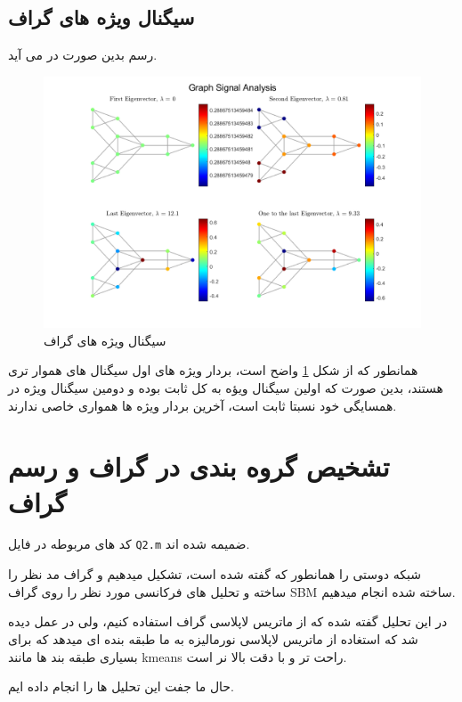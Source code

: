 \subsection{سیگنال ویژه های گراف}

رسم بدین صورت در می آید.

\begin{figure}[h]
	\centering
	\includegraphics*[width=\linewidth]{../results/Q1/eigenvalues.png}
	\caption{سیگنال ویژه های گراف}
	\label{fig:eigvec}
\end{figure}

همانطور که از شکل \ref{fig:eigvec} واضح است، بردار ویژه های اول سیگنال های
هموار تری هستند، بدین صورت که اولین سیگنال ویؤه به کل ثابت بوده و دومین سیگنال ویژه در همسایگی
خود نسبتا ثابت است، آخرین بردار ویژه ها همواری خاصی ندارند.

\clearpage

\section{تشخیص گروه بندی در گراف و رسم گراف}

کد های مربوطه در فایل \texttt{Q2.m} ضمیمه شده اند.

شبکه دوستی را همانطور که گفته شده است، تشکیل میدهیم و گراف مد نظر را ساخته و تحلیل های فرکانسی مورد نظر را
روی گراف SBM ساخته شده انجام میدهیم.

در این تحلیل گفته شده که از ماتریس لاپلاسی گراف استفاده کنیم، ولی در عمل دیده شد که استغاده از ماتریس
لاپلاسی نورمالیزه به ما طبقه بنده ای میدهد که برای بسیاری طبقه بند ها مانند kmeans راحت تر و با دقت بالا نر است.

حال ما جفت این تحلیل ها را انجام داده ایم.

